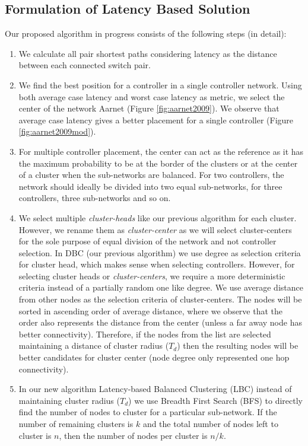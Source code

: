 \documentclass{article}
\begin{document}
	\subsection{Formulation of Latency Based Solution}
	Our proposed algorithm in progress consists of the following steps (in detail):
	\begin{enumerate}
		\item We calculate all pair shortest paths considering latency as the distance between each connected switch pair.
		
		\item We find the best position for a controller in a single controller network. Using both average case latency and worst case latency as metric, we select the center of the network Aarnet (Figure \ref{fig:aarnet2009}). We observe that average case latency gives a better placement for a single controller (Figure \ref{fig:aarnet2009mod}).
		
		\item For multiple controller placement, the center can act as the reference as it has the maximum probability to be at the border of the clusters or at the center of a cluster when the sub-networks are balanced. For two controllers, the network should ideally be divided into two equal sub-networks, for three controllers, three sub-networks and so on.
		
		\item We select multiple \textit{cluster-heads} like our previous algorithm for each cluster. However, we rename them as \textit{cluster-center} as we will select cluster-centers for the sole purpose of equal division of the network and not controller selection. In DBC (our previous algorithm) we use degree as selection criteria for cluster head, which makes sense when selecting controllers. However, for selecting cluster heads or \textit{cluster-centers}, we require a more deterministic criteria instead of a partially random one like degree. We use average distance from other nodes as the selection criteria of cluster-centers. The nodes will be sorted in ascending order of average distance, where we observe that the order also represents the distance from the center (unless a far away node has better connectivity). Therefore, if the nodes from the list are selected maintaining a distance of cluster radius ($T_d$) then the resulting nodes will be better candidates for cluster center (node degree only represented one hop connectivity).
		
		\item In our new algorithm Latency-based Balanced Clustering (LBC) instead of maintaining cluster radius ($T_d$) we use Breadth First Search (BFS) to directly find the number of nodes to cluster for a particular sub-network. If the number of remaining clusters is $k$ and the total number of nodes left to cluster is $n$, then the number of nodes per cluster is $n/k$.
		

\end{enumerate}
\end{document}
